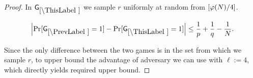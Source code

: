 \begin{proof}
%
%

In $\games_\thisgame$ we sample $r$ uniformly at random from $[\varphi(N)/4]$. 
\begin{lemma}
\[
\left|\Pr[\games_\prevgame = 1] - \Pr[\games_\thisgame = 1]\right| \leq \frac{1}{p}+\frac{1}{q}-\frac{1}{N}.
\]
\end{lemma}
Since the only difference between the two games is in the set from which we sample $r$, to upper bound the advantage of adversary we can use  with $\ell:=4$, which directly yields required upper bound.


\end{proof}
